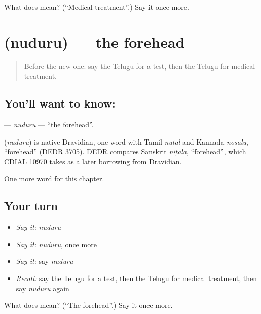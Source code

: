 \begin{tcolorbox}[breakable,colback=teal!4,colframe=teal!35!black,title={Before you move on}]
What does  mean? (\textquotedblleft{}Medical treatment\textquotedblright{}.) Say it once more.
\end{tcolorbox}
\section[\texorpdfstring{\te{నుదురు} (nuduru)}{నుదురు (nuduru)}]{ (nuduru) — the forehead}

\label{lesson:TE-C209-nuduru}



\begin{quote}
Before the new one: say the Telugu for a test, then the Telugu for medical treatment.
\end{quote}

\subsection*{You'll want to know: }
\textbf{} — \emph{nuduru} — \textquotedblleft{}the forehead\textquotedblright{}.

\begin{cousinweb}
\textbf{} (\emph{nuduru}) is native Dravidian, one word with Tamil \emph{nutal} and Kannada \emph{nosalu}, \textquotedblleft{}forehead\textquotedblright{} (DEDR 3705). DEDR compares Sanskrit \emph{niṭāla}, \textquotedblleft{}forehead\textquotedblright{}, which CDIAL 10970 takes as a later borrowing from Dravidian.
\end{cousinweb}

\begin{grammarlens}[title={What you've built}]
One more word for this chapter.
\end{grammarlens}

\subsection*{Your turn}
\begin{itemize}
\raggedright
  \item \emph{Say it:} \emph{nuduru}
  \item \emph{Say it:} \emph{nuduru}, once more
  \item \emph{Say it:} say \emph{nuduru}
  \item \emph{Recall:} say the Telugu for a test, then the Telugu for medical treatment, then say \emph{nuduru} again
\end{itemize}

\begin{tcolorbox}[breakable,colback=teal!4,colframe=teal!35!black,title={Before you move on}]
What does  mean? (\textquotedblleft{}The forehead\textquotedblright{}.) Say it once more.
\end{tcolorbox}
